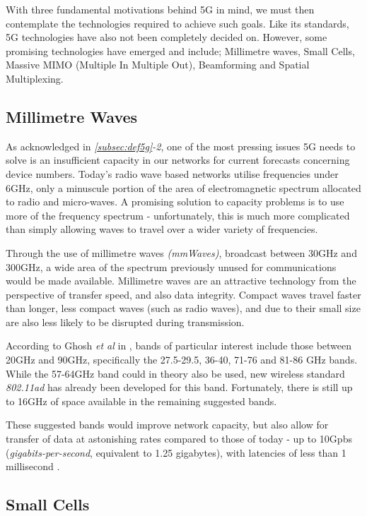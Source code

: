 \documentclass[journal]{IEEEtran}
\begin{document}
With three fundamental motivations behind 5G in mind, we must then contemplate the technologies required to achieve such goals. Like its standards, 5G technologies have also not been completely decided on. However, some promising technologies have emerged and include; Millimetre waves, Small Cells, Massive MIMO (Multiple In Multiple Out), Beamforming and Spatial Multiplexing.

\subsection{Millimetre Waves}
As acknowledged in \textit{\ref{subsec:def5g}-2}, one of the most pressing issues 5G needs to solve is an insufficient capacity in our networks for current forecasts concerning device numbers. Today's radio wave based networks utilise frequencies under 6GHz, only a minuscule portion of the area of electromagnetic spectrum allocated to radio and micro-waves. A promising solution to capacity problems is to use more of the frequency spectrum - unfortunately, this is much more complicated than simply allowing waves to travel over a wider variety of frequencies. 

Through the use of millimetre waves \textit{(mmWaves)}, broadcast between 30GHz and 300GHz, a wide area of the spectrum previously unused for communications would be made available. Millimetre waves are an attractive technology from the perspective of transfer speed, and also data integrity. Compact waves travel faster than longer, less compact waves (such as radio waves), and due to their small size are also less likely to be disrupted during transmission.

According to Ghosh \textit{et al} in \cite{mmwave}, bands of particular interest include those between 20GHz and 90GHz, specifically the 27.5-29.5, 36-40, 71-76 and 81-86 GHz bands. While the 57-64GHz band could in theory also be used, new wireless standard \textit{802.11ad} has already been developed for this band. Fortunately, there is still up to 16GHz of space available in the remaining suggested bands. 

These suggested bands would improve network capacity, but also allow for transfer of data at astonishing rates compared to those of today - up to 10Gpbs (\textit{gigabits-per-second}, equivalent to 1.25 gigabytes), with latencies of less than 1 millisecond \cite{mmwave}. 

\subsection{Small Cells}\label{subsec:smallcells}
\end{document}
